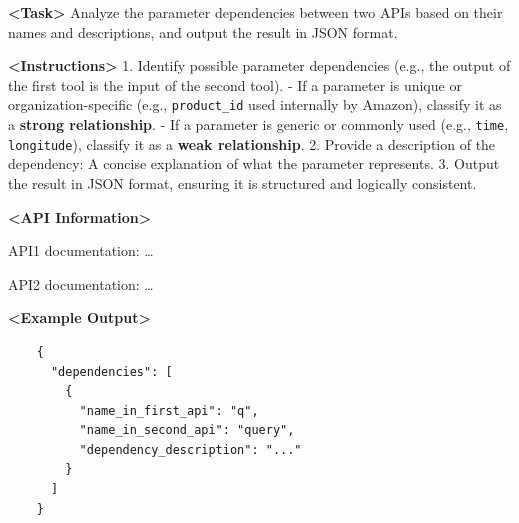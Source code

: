 \begin{table}[htbp]
    \centering
    \label{tab:analyze_api_dependencies} %
    \begin{tcolorbox}[colback=bgcolor, colframe=black, width=0.95\textwidth, boxrule=0.5mm, 
    coltitle=white, colbacktitle=titlecolor, title=Task: Analyze API Dependencies]
    
    \textbf{<Task>} Analyze the parameter dependencies between two APIs based on their names and descriptions, and output the result in JSON format.
    
    \textbf{<Instructions>}
    1. Identify possible parameter dependencies (e.g., the output of the first tool is the input of the second tool).  
       - If a parameter is unique or organization-specific (e.g., \texttt{product\_id} used internally by Amazon), classify it as a \textbf{strong relationship}.  
       - If a parameter is generic or commonly used (e.g., \texttt{time}, \texttt{longitude}), classify it as a \textbf{weak relationship}.  
    2. Provide a description of the dependency: A concise explanation of what the parameter represents.  
    3. Output the result in JSON format, ensuring it is structured and logically consistent.  
    
    \vspace{0.5em}
    
    \textbf{<API Information>} 

    API1 documentation: \dots

    API2 documentation: \dots 
    
    \vspace{0.5em}
    
    \textbf{<Example Output>}  
    
    \begin{verbatim}
    {
      "dependencies": [
        {
          "name_in_first_api": "q",
          "name_in_second_api": "query",
          "dependency_description": "..."
        }
      ]
    }
    \end{verbatim}
    
    \end{tcolorbox}
\end{table}



